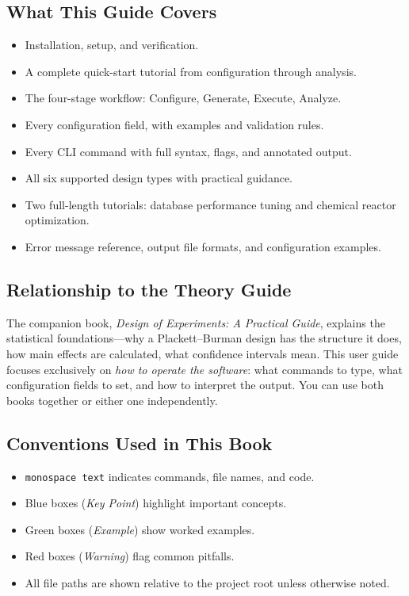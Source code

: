 \documentclass[11pt]{book}
\begin{document}
\subsection*{What This Guide Covers}

\begin{itemize}[nosep]
  \item Installation, setup, and verification.
  \item A complete quick-start tutorial from configuration through analysis.
  \item The four-stage workflow: Configure, Generate, Execute, Analyze.
  \item Every configuration field, with examples and validation rules.
  \item Every CLI command with full syntax, flags, and annotated output.
  \item All six supported design types with practical guidance.
  \item Two full-length tutorials: database performance tuning and chemical reactor optimization.
  \item Error message reference, output file formats, and configuration examples.
\end{itemize}

\subsection*{Relationship to the Theory Guide}

The companion book, \emph{Design of Experiments: A Practical Guide}, explains the statistical foundations---why a Plackett--Burman design has the structure it does, how main effects are calculated, what confidence intervals mean. This user guide focuses exclusively on \emph{how to operate the software}: what commands to type, what configuration fields to set, and how to interpret the output. You can use both books together or either one independently.

\subsection*{Conventions Used in This Book}

\begin{itemize}[nosep]
  \item \texttt{monospace text} indicates commands, file names, and code.
  \item Blue boxes (\emph{Key Point}) highlight important concepts.
  \item Green boxes (\emph{Example}) show worked examples.
  \item Red boxes (\emph{Warning}) flag common pitfalls.
  \item All file paths are shown relative to the project root unless otherwise noted.
\end{itemize}
\end{document}
